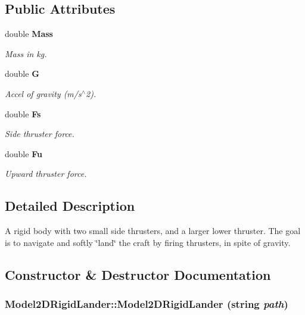 \subsection*{Public Attributes}
\begin{CompactItemize}
\item 
double {\bf Mass}
\begin{CompactList}\small\item\em Mass in kg.\item\end{CompactList}\item 
double {\bf G}
\begin{CompactList}\small\item\em Accel of gravity (m/s$^\wedge$2).\item\end{CompactList}\item 
double {\bf Fs}
\begin{CompactList}\small\item\em Side thruster force.\item\end{CompactList}\item 
double {\bf Fu}
\begin{CompactList}\small\item\em Upward thruster force.\item\end{CompactList}\end{CompactItemize}


\subsection{Detailed Description}
A rigid body with two small side thrusters, and a larger lower thruster. The goal is to navigate and softly \char`\"{}land\char`\"{} the craft by firing thrusters, in spite of gravity.



\subsection{Constructor \& Destructor Documentation}
\subsubsection{\setlength{\rightskip}{0pt plus 5cm}Model2DRigid\-Lander::Model2DRigid\-Lander (string {\em path})}\label{class_Model2DRigidLander_a0}


